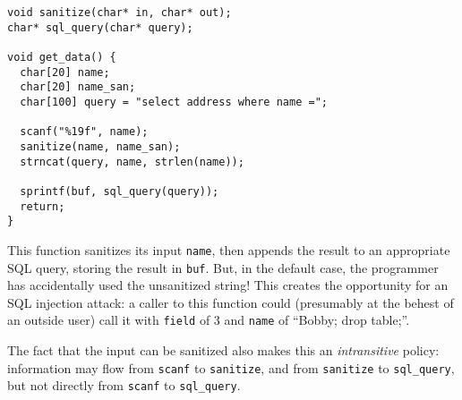 \documentclass{llncs}
\begin{document}
\begin{verbatim}
void sanitize(char* in, char* out);
char* sql_query(char* query);

void get_data() {
  char[20] name;
  char[20] name_san;
  char[100] query = "select address where name =";

  scanf("%19f", name);
  sanitize(name, name_san);
  strncat(query, name, strlen(name));
  
  sprintf(buf, sql_query(query));
  return;
}
\end{verbatim}

This function sanitizes its input {\tt name}, then appends the result to an appropriate SQL
query, storing the result in {\tt buf}. But, in the default case, the programmer has accidentally
used the unsanitized string! This creates the opportunity for an SQL injection attack: a caller
to this function could (presumably at the behest of an outside user) call it with {\tt field} of
3 and {\tt name} of ``Bobby; drop table;''.

The fact that the input can be sanitized also makes this an {\em intransitive} policy:
information may flow from {\tt scanf} to {\tt sanitize}, and from {\tt sanitize} to
{\tt sql\_query}, but not directly from {\tt scanf} to {\tt sql\_query}.
\end{document}
